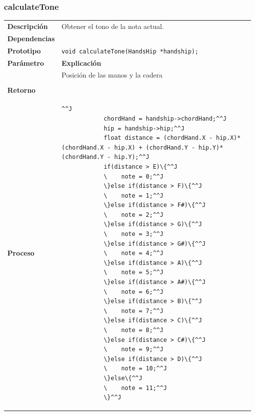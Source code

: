 \documentclass[a4paper,12pt]{article}
\begin{document}
\subsubsection{calculateTone}
\begin{tabularx}{\textwidth}{p{25mm} X}
        \textbf{Descripción} & Obtener el tono de la nota actual. \\
        \textbf{Dependencias} & \\
        \textbf{Prototipo} & \lstinline{void calculateTone(HandsHip *handship);}\\
        \textbf{Parámetro} & \textbf{Explicación} \\
        \begin{tabular}{p{2cm} l}
                handsHip & Posición de las manos y la cadera \\
        \end{tabular}\\

        \textbf{Retorno} & \\
        \textbf{Proceso} & 
               \begin{lstlisting}[breaklines=true]^^J
            chordHand = handship->chordHand;^^J
            hip = handship->hip;^^J
            float distance = (chordHand.X - hip.X)*(chordHand.X - hip.X) + (chordHand.Y - hip.Y)*(chordHand.Y - hip.Y);^^J
            if(distance > E)\{^^J
            \    note = 0;^^J
            \}else if(distance > F)\{^^J
            \    note = 1;^^J
            \}else if(distance > F#)\{^^J
            \    note = 2;^^J
            \}else if(distance > G)\{^^J
            \    note = 3;^^J
            \}else if(distance > G#)\{^^J
            \    note = 4;^^J
            \}else if(distance > A)\{^^J
            \    note = 5;^^J
            \}else if(distance > A#)\{^^J
            \    note = 6;^^J
            \}else if(distance > B)\{^^J
            \    note = 7;^^J
            \}else if(distance > C)\{^^J
            \    note = 8;^^J
            \}else if(distance > C#)\{^^J
            \    note = 9;^^J
            \}else if(distance > D)\{^^J
            \    note = 10;^^J
            \}else\{^^J
            \    note = 11;^^J
            \}^^J
        \end{lstlisting} 
 \\
\end{tabularx}
\end{document}

